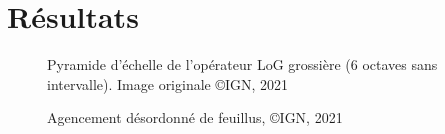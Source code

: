 \documentclass{article}
\begin{document}
	\section{Résultats}
		\centering
		\begin{figure}[!h]
			\caption{Pyramide d'échelle de l'opérateur LoG grossière (6 octaves sans intervalle). Image originale \copyright IGN, 2021}
		\end{figure}
		\begin{figure}[!h]
			\caption{Agencement désordonné de feuillus, \copyright IGN, 2021}
		\end{figure}
\end{document}
